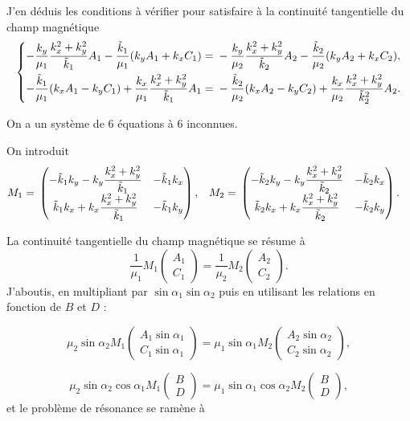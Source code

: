 \documentclass{amsart}
\def \C {\mathbb C}
\begin{document}
J'en déduis les conditions à vérifier pour satisfaire à la continuité tangentielle du champ magnétique
\[
\left\{
\begin{aligned}
-\dfrac{k_y}{\mu_1}\dfrac{k_x^2+k_y^2}{\tilde{k}_1}A_1-\dfrac{\tilde{k}_1}{\mu_1}(k_yA_1+k_xC_1)={}&-\dfrac{k_y}{\mu_2}\dfrac{k_x^2+k_y^2}{\tilde{k}_2}A_2-\dfrac{\tilde{k}_2}{\mu_2}(k_yA_2+k_xC_2),
\\
-\dfrac{\tilde{k}_1}{\mu_1}(k_xA_1-k_yC_1)+\dfrac{k_x}{\mu_1}\dfrac{k_x^2+k_y^2}{\tilde{k}_1}A_1={}&-\dfrac{\tilde{k}_2}{\mu_2}(k_xA_2-k_yC_2)+\dfrac{k_x}{\mu_2}\dfrac{k_x^2+k_y^2}{\tilde{k}_2^2}A_2.
\end{aligned}
\right.
\]

On a un système de 6 équations à 6 inconnues.

On introduit
\begin{align*}
M_1={}&
\begin{pmatrix}
-\tilde{k}_1k_y-k_y\dfrac{k_x^2+k_y^2}{\tilde{k}_1}  &   -\tilde{k}_1k_x
\cr
\tilde{k}_1k_x+k_x\dfrac{k_x^2+k_y^2}{\tilde{k}_1}   &   -\tilde{k}_1k_y
\end{pmatrix},
&
M_2={}&
\begin{pmatrix}
-\tilde{k}_2k_y-k_y\dfrac{k_x^2+k_y^2}{\tilde{k}_2}  &   -\tilde{k}_2k_x
\cr
\tilde{k}_2k_x+k_x\dfrac{k_x^2+k_y^2}{\tilde{k}_2}   &   -\tilde{k}_2k_y
\end{pmatrix}.
\end{align*}

La continuité tangentielle du champ magnétique se résume à 
\[
\frac{1}{\mu_1}M_1\begin{pmatrix}A_1\\C_1\end{pmatrix}=\frac{1}{\mu_2}M_2\begin{pmatrix}A_2\\C_2\end{pmatrix}.
\]
J'aboutis, en multipliant par \(\sin \alpha_1\sin \alpha_2\) puis en utilisant les relations en fonction de \(B\) et \(D\) :

\[
\mu_2\sin\alpha_2M_1\begin{pmatrix}A_1\sin \alpha_1\\C_1\sin \alpha_1\end{pmatrix}
=
\mu_1\sin \alpha_1M_2\begin{pmatrix}A_2\sin \alpha_2\\C_2\sin \alpha_2\end{pmatrix},
\]

\[
\mu_2\sin \alpha_2\cos \alpha_1 M_1\begin{pmatrix}B\\D\end{pmatrix}
=
\mu_1\sin \alpha_1\cos \alpha_2M_2\begin{pmatrix}B\\D\end{pmatrix},
\]
et le problème de résonance se ramène à 
\end{document}
